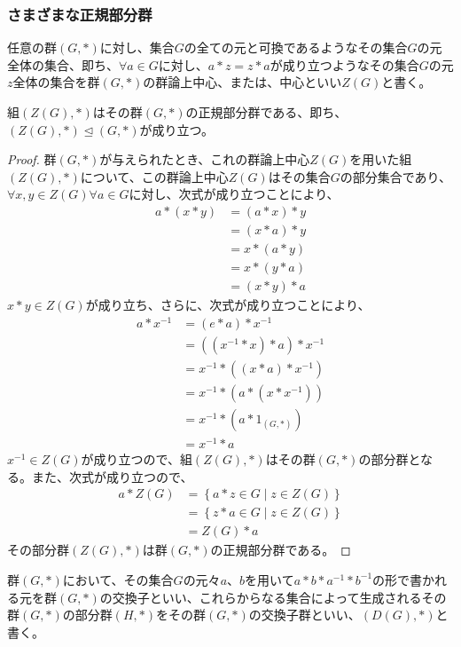 \documentclass[dvipdfmx]{jsarticle}
\begin{document}
\subsubsection{さまざまな正規部分群}%
\begin{dfn}
任意の群$(G,*)$に対し、集合$G$の全ての元と可換であるようなその集合$G$の元全体の集合、即ち、$\forall a \in G$に対し、$a*z = z*a$が成り立つようなその集合$G$の元$z$全体の集合を群$(G,*)$の群論上中心、または、中心といい$Z(G)$と書く。
\end{dfn}
\begin{thm}\label{3.1.1.42}
組$\left( Z(G),* \right)$はその群$(G,*)$の正規部分群である、即ち、$\left( Z(G),* \right) \trianglelefteq (G,*)$が成り立つ。
\end{thm}
\begin{proof}
群$(G,*)$が与えられたとき、これの群論上中心$Z(G)$を用いた組$\left( Z(G),* \right)$について、この群論上中心$Z(G)$はその集合$G$の部分集合であり、$\forall x,y \in Z(G)\forall a \in G$に対し、次式が成り立つことにより、
\begin{align*}
a*(x*y) &= (a*x)*y\\
&= (x*a)*y\\
&= x*(a*y)\\
&= x*(y*a)\\
&= (x*y)*a
\end{align*}
$x*y \in Z(G)$が成り立ち、さらに、次式が成り立つことにより、
\begin{align*}
a*x^{- 1} &= (e*a)*x^{- 1}\\
&= \left( \left( x^{- 1}*x \right)*a \right)*x^{- 1}\\
&= x^{- 1}*\left( (x*a)*x^{- 1} \right)\\
&= x^{- 1}*\left( a*\left( x*x^{- 1} \right) \right)\\
&= x^{- 1}*\left( a*1_{(G,*)} \right)\\
&= x^{- 1}*a
\end{align*}
$x^{- 1} \in Z(G)$が成り立つので、組$\left( Z(G),* \right)$はその群$(G,*)$の部分群となる。また、次式が成り立つので、
\begin{align*}
a*Z(G) &= \left\{ a*z \in G \middle| z \in Z(G) \right\}\\
&= \left\{ z*a \in G \middle| z \in Z(G) \right\}\\
&= Z(G)*a
\end{align*}
その部分群$\left( Z(G),* \right)$は群$(G,*)$の正規部分群である。
\end{proof}
\begin{dfn}
群$(G,*)$において、その集合$G$の元々$a$、$b$を用いて$a*b*a^{- 1}*b^{- 1}$の形で書かれる元を群$(G,*)$の交換子といい、これらからなる集合によって生成されるその群$(G,*)$の部分群$(H,*)$をその群$(G,*)$の交換子群といい、$\left( D(G),* \right)$と書く。
\end{dfn}
\end{document}
